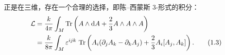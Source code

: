 \documentclass[11pt,a4paper]{article}
\DeclareMathOperator{\Tr}{Tr}
\begin{document}

正是在三维，存在一个合理的选择，即陈–西蒙斯 3-形式的积分：
\begin{align}
    \mathcal{L} &= \frac{k}{4\pi}\int_M \Tr\left(A\wedge \mathrm{d}A+\frac{2}{3}A\wedge A\wedge A\right) \notag\\
    &= \frac{k}{8\pi}\int_M \varepsilon^{ijk}\,\Tr\left(A_i(\partial_jA_k-\partial_kA_j)
        +\frac{2}{3}A_i[A_j,A_k]\right).
    \tag{1.3}
\end{align}

\end{document}
